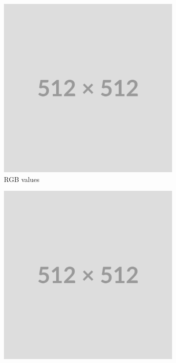\begin{figure}[h]
    \centering
    \begin{subfigure}[b]{0.24\textwidth}
        \centering
        \includegraphics[width=\textwidth]{img/placeholder512.png}
        \caption{RGB values}
    \end{subfigure}
    \begin{subfigure}[b]{0.24\textwidth}
        \centering
        \includegraphics[width=\textwidth]{img/placeholder512.png}

\end{subfigure}
\end{figure}
